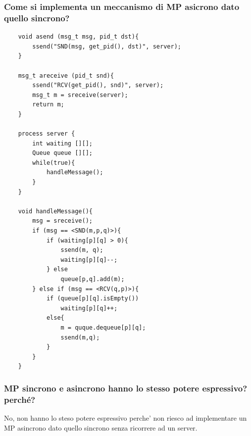 \documentclass{article}
\begin{document}
\subsubsection{Come si implementa un meccanismo di MP asicrono dato quello sincrono?}
\begin{verbatim}
    void asend (msg_t msg, pid_t dst){
        ssend("SND(msg, get_pid(), dst)", server);
    }

    msg_t areceive (pid_t snd){
        ssend("RCV(get_pid(), snd)", server);
        msg_t m = sreceive(server);
        return m;
    }

    process server {
        int waiting [][];
        Queue queue [][];
        while(true){
            handleMessage();
        }
    }

    void handleMessage(){
        msg = sreceive();
        if (msg == <SND(m,p,q)>){
            if (waiting[p][q] > 0){
                ssend(m, q);
                waiting[p][q]--;
            } else
                queue[p,q].add(m);
        } else if (msg == <RCV(q,p)>){
            if (queue[p][q].isEmpty())
                waiting[p][q]++;
            else{
                m = quque.dequeue[p][q];
                ssend(m,q);
            }
        }
    }
\end{verbatim}
\subsubsection{MP sincrono e asincrono hanno lo stesso potere espressivo? perché?}
No, non hanno lo steso potere espressivo perche' non riesco ad implementare un MP asincrono dato quello sincrono senza ricorrere ad un server.
\end{document}
